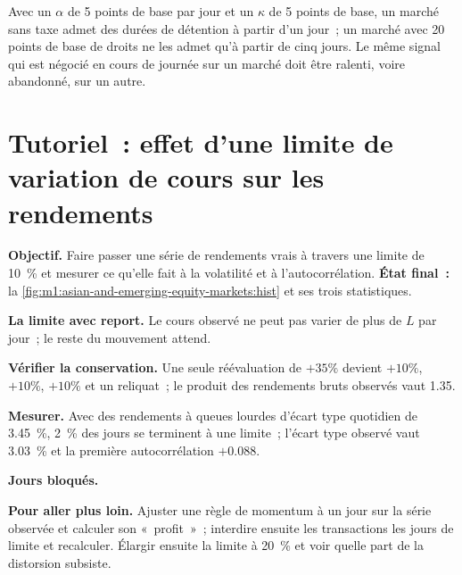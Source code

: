Avec un $\alpha$ de 5 points de base par jour et un $\kappa$ de 5 points de base, un
marché sans taxe admet des durées de détention à partir d'un jour~; un marché avec 20
points de base de droits ne les admet qu'à partir de cinq jours. Le même signal qui est négocié
en cours de journée sur un marché doit être ralenti, voire abandonné, sur un autre.

\section{Tutoriel~: effet d'une limite de variation de cours sur les rendements}\label{tut:m1:asian-and-emerging-equity-markets:limits}

\begin{tutorial}
\textbf{Objectif.} Faire passer une série de rendements vrais à travers une limite de 10~\% et mesurer
ce qu'elle fait à la volatilité et à l'autocorrélation. \textbf{État final~:}
la \cref{fig:m1:asian-and-emerging-equity-markets:hist} et ses trois
statistiques.
\begin{tutsteps}
\item \textbf{La limite avec report.} Le cours observé ne peut pas varier de plus de $L$ par jour~;
le reste du mouvement attend.
\label{lst:m1:asian-and-emerging-equity-markets:truncate}
\item \textbf{Vérifier la conservation.} Une seule réévaluation de $+35\%$ devient
$+10\%$, $+10\%$, $+10\%$ et un reliquat~; le produit des rendements bruts observés
vaut 1.35.
\item \textbf{Mesurer.} Avec des rendements à queues lourdes d'écart type quotidien de 3.45~\%,
2~\% des jours se terminent à une limite~; l'écart type observé vaut 3.03~\% et la première
autocorrélation $+0.088$.
\item \textbf{Jours bloqués.}
\label{lst:m1:asian-and-emerging-equity-markets:locked}
\end{tutsteps}
\textbf{Pour aller plus loin.} Ajuster une règle de momentum à un jour sur la série observée et
calculer son «~profit~»~; interdire ensuite les transactions les jours de limite et recalculer.
Élargir ensuite la limite à 20~\% et voir quelle
part de la distorsion subsiste.
\end{tutorial}

